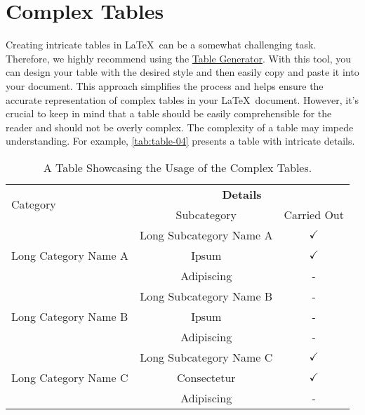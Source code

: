 \section{Complex Tables}
Creating intricate tables in \LaTeX\ can be a somewhat challenging task. Therefore, we highly recommend using the \href{https://www.tablesgenerator.com/}{Table Generator}. With this tool, you can design your table with the desired style and then easily copy and paste it into your document. This approach simplifies the process and helps ensure the accurate representation of complex tables in your \LaTeX\ document. However, it's crucial to keep in mind that a table should be easily comprehensible for the reader and should not be overly complex. The complexity of a table may impede understanding. For example, \autoref{tab:table-04} presents a table with intricate details.

\begin{table}[!htpb]
    \caption{A Table Showcasing the Usage of the Complex Tables.}
    \label{tab:table-04}
    \centering
    \begin{tabular}{lcc}
        \toprule
        \multirow{2}{*}{Category} & \multicolumn{2}{c}{\textbf{Details}} \\
        \cmidrule(lr){2-3}
        & Subcategory & Carried Out \\
        \midrule
        \multirow{3}{*}{Long Category Name A} & Long Subcategory Name A & $\checkmark$ \\
        & Ipsum & $\checkmark$ \\
        & Adipiscing & - \\
        \midrule
        \multirow{3}{*}{Long Category Name B} & Long Subcategory Name B & - \\
        & Ipsum & - \\
        & Adipiscing & - \\
        \midrule
        \multirow{3}{*}{Long Category Name C} & Long Subcategory Name C & $\checkmark$ \\
        & Consectetur & $\checkmark$ \\
        & Adipiscing & - \\
        \bottomrule
    \end{tabular}
\end{table}